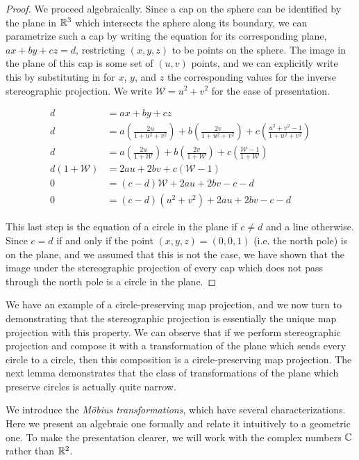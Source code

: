 \begin{proof}
  We proceed algebraically.  Since a cap on the sphere can be
  identified by the plane in $\mathbb{R}^3$ which intersects the sphere along
  its boundary, we can parametrize such a cap by writing the equation
  for its corresponding plane, $ax+by+cz=d$, restricting $(x,y,z)$ to
  be points on the sphere.  The image in the plane of this cap is some
  set of $(u,v)$ points, and we can explicitly write this by
  substituting in for $x$, $y$, and $z$ the corresponding values for
  the inverse stereographic projection.  We write
  $\mathcal{W}=u^2+v^2$ for the ease of presentation. 

  \begin{align*}
    d&=ax+by+cz\\
    d&=a\left(\frac{2u}{1+u^2+v^2}\right)+b\left(\frac{2v}{1+u^2+v^2}\right)+c\left(\frac{u^2+v^2-1}{1+u^2+v^2}\right)\\
    d&=a\left(\frac{2u}{1+\mathcal{W}}\right)+b\left(\frac{2v}{1+\mathcal{W}}\right)+c\left(\frac{\mathcal{W}-1}{1+\mathcal{W}}\right)\\
    d\left(1+\mathcal{W}\right)&=2au+2bv+c\left(\mathcal{W}-1\right)\\ 
    0 &=    (c-d)\mathcal{W} + 2au +2bv - c - d\\
    0 &= (c-d)(u^2+v^2)+2au+2bv - c - d
  \end{align*}

  This last step is the equation of a circle in the plane if $c\neq d$
  and a line otherwise.  Since $c=d$ if and only if the point
  $(x,y,z)=(0,0,1)$ (i.e. the north pole) is on the plane, and we
  assumed that this is not the case, we have shown that the image
  under the stereographic projection of every cap which does not pass
  through the north pole is a circle in the plane.

\end{proof}

We have an example of a  circle-preserving map projection, and we now
turn to demonstrating that the stereographic projection is essentially
the unique map projection with this property.  We can observe that if
we perform stereographic projection and compose it with
a transformation of the plane which sends every circle to a circle,
then this composition is a circle-preserving map projection.  The next
lemma demonstrates that the class of transformations of the plane
which preserve circles is actually quite narrow.


We introduce the \textit{M\"obius transformations}, which have several characterizations.  Here we present an algebraic one formally and relate it intuitively to a geometric one.  To make the presentation clearer, we will work with the complex numbers $\mathbb{C}$ rather than $\mathbb{R}^2$.

